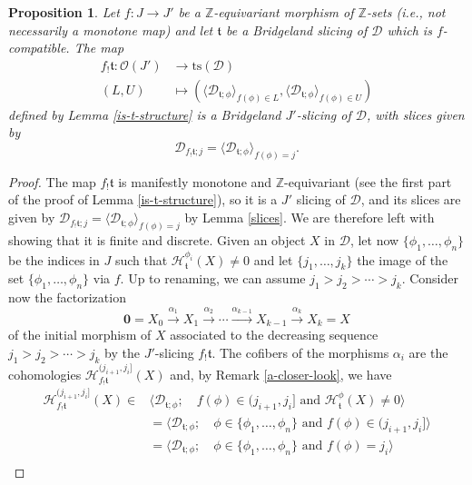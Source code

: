 \documentclass{article}
\newtheorem{prop}[thm]{Proposition}
\theoremstyle{definition}
\newcommand{\Z}{\mathbb{Z}}
\newcommand{\Oo}{\mathcal{O}}
\newcommand{\ts}{\mathrm{ts}}
\newcommand{\tee}{\mathfrak{t}}
\begin{document}
\begin{prop}
Let $f\colon J\to J'$ be a $\Z$-equivariant morphism of $\Z$-sets (i.e., not necessarily a monotone map) and let $\tee$ be a Bridgeland slicing of $\mathscr{D}$ which is $f$-compatible.  The map
\begin{align*}
f_!\tee\colon \Oo(J')&\to\ts(\mathscr{D})\\
(L,U)&\mapsto (\langle \mathscr{D}_{\tee;\phi}\rangle_{f(\phi)\in L},\langle \mathscr{D}_{\tee;\phi}\rangle_{f(\phi)\in U})
\end{align*}
defined by Lemma \ref{is-t-structure} is a Bridgeland $J'$-slicing of $\mathscr{D}$, with slices given by
\[
\mathscr{D}_{f_!\tee;j}=\langle \mathscr{D}_{\tee;\phi}\rangle_{f(\phi)=j}.
\]
\end{prop}
\begin{proof}
The map $f_!\tee$ is manifestly monotone and $\Z$-equivariant (see the first part of the proof of Lemma \ref{is-t-structure}), so it is a $J'$ slicing of $\mathscr{D}$, and its slices are given by $\mathscr{D}_{f_!\tee;j}=
\langle \mathscr{D}_{\tee;\phi}\rangle_{f(\phi)=j}$ by Lemma \ref{slices}. We are therefore left with showing that it is finite and discrete. Given an object $X$ in $\mathscr{D}$, let now $\{\phi_1,\dots,\phi_n\}$ be the indices in $J$ such that $\mathcal{H}^{\phi_i}_\tee(X)\neq 0$ and let $\{j_1,\dots,j_k\}$ the image of the set $\{\phi_1,\dots,\phi_n\}$ via $f$. Up to renaming, we can assume $j_1>j_{2}>\cdots>j_k$. Consider now the factorization
\[
\mathbf{0}=X_0 \xrightarrow{\alpha_1} X_1\xrightarrow{\alpha_2}\cdots \xrightarrow{\alpha_{k-1}}X_{k-1}\xrightarrow{\alpha_k} X_k=X
\]
of the initial morphism of $X$ associated to the decreasing sequence $j_1>j_2>\cdots>j_k$ by the $J'$-slicing $f_!\tee$. The cofibers of the morphisms $\alpha_{i}$ are the cohomologies
$\mathcal{H}^{(j_{i+1},j_{i}]}_{f_!\tee}(X)$ and, by Remark \ref{a-closer-look}, we have
\begin{align*}
\mathcal{H}^{(j_{i+1},j_{i}]}_{f_!\tee}(X)\in& \langle \mathscr{D}_{\tee;\phi};\quad f(\phi)\in (j_{i+1},j_{i}] \text{ and }\mathcal{H}^\phi_\tee(X)\neq 0\rangle\\
&=\langle \mathscr{D}_{\tee;\phi};\quad \phi\in\{\phi_1,\dots,\phi_n\}\text{ and } f(\phi)\in(j_{i+1},j_{i}]\rangle\\
&=\langle \mathscr{D}_{\tee;\phi};\quad \phi\in\{\phi_1,\dots,\phi_n\}\text{ and } f(\phi)=j_{i}\rangle\\

\end{align*}
\end{proof}
\end{document}
